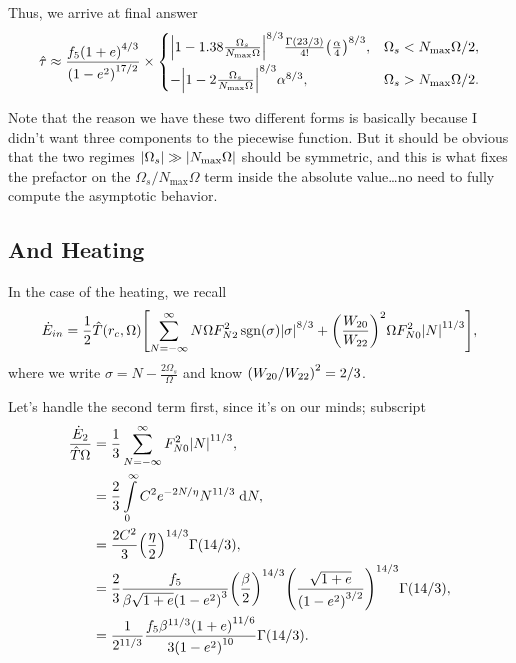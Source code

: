 \documentclass[11pt,
        usenames, %
        dvipsnames %
    ]{article}
\DeclareMathOperator{\sgn}{sgn}
\DeclarePairedDelimiter\abs{\lvert}{\rvert}
\DeclarePairedDelimiter\p{\lparen}{\rparen}
\DeclarePairedDelimiter\s{\lbrack}{\rbrack}
\begin{document}
Thus, we arrive at final answer
\begin{equation}
    \hat{\tau} \approx \frac{f_5\p*{1 + e}^{4/3}}{\p*{1 - e^2}^{17/2}} \times
    \begin{cases}
        \abs*{1 - 1.38\frac{\Omega_s}{N_{\max}\Omega}}^{8/3}
            \frac{\Gamma(23/3)}{4!}\p*{\frac{\alpha}{4}}^{8/3},
            & \Omega_s < N_{\max}\Omega / 2,\\[5pt]
        -\abs*{1 - 2\frac{\Omega_s}{N_{\max}\Omega}}^{8/3} \alpha^{8/3},
            & \Omega_s > N_{\max}\Omega / 2.
    \end{cases}\label{eq:traveling_torque}
\end{equation}

Note that the reason we have these two different forms is basically because I
didn't want three components to the piecewise function. But it should be obvious
that the two regimes $\abs*{\Omega_s} \gg \abs*{N_{\max}\Omega}$ should be
symmetric, and this is what fixes the prefactor on the $\Omega_s /
N_{\max}\Omega$ term inside the absolute value\dots no need to fully compute the
asymptotic behavior.

\subsection{And Heating}

In the case of the heating, we recall
\begin{align}
     \dot{E}_{in} = \frac{1}{2}\hat{T}\p*{r_c, \Omega}\s*{
         \sum\limits_{N = -\infty}^\infty
            N\Omega F_{N2}^2 \sgn \p*{\sigma} \abs*{\sigma}^{8/3}
            + \p*{\frac{W_{20}}{W_{22}}}^2\Omega F_{N0}^2 \abs*{N}^{11/3}},
\end{align}
where we write $\sigma = N - \frac{2\Omega_s}{\Omega}$ and know $\p*{W_{20} /
W_{22}}^2 = 2/3$.

Let's handle the second term first, since it's on our minds; subscript
\begin{align}
    \frac{\dot{E}_2}{\hat{T}\Omega}
        &= \frac{1}{3} \sum\limits_{N = -\infty}^\infty
            F_{N0}^2\abs*{N}^{11/3},\\
        &= \frac{2}{3}\int\limits_0^\infty C^2e^{-2N/\eta}N^{11/3}\;\mathrm{d}N,\\
        &= \frac{2C^2}{3}\p*{\frac{\eta}{2}}^{14/3}\Gamma(14/3),\\
        &= \frac{2}{3}\frac{f_5}{\beta\sqrt{1 + e}\p*{1 - e^2}^3}
            \p*{\frac{\beta}{2}}^{14/3}\p*{\frac{\sqrt{1 + e}}{\p*{1 -
                e^2}^{3/2}}}^{14/3} \Gamma(14/3),\\
        &= \frac{1}{2^{11/3}}
            \frac{f_5 \beta^{11/3}\p*{1 + e}^{11/6}}{3\p*{1 - e^2}^{10}}
            \Gamma\p*{14/3}.
\end{align}
\end{document}
